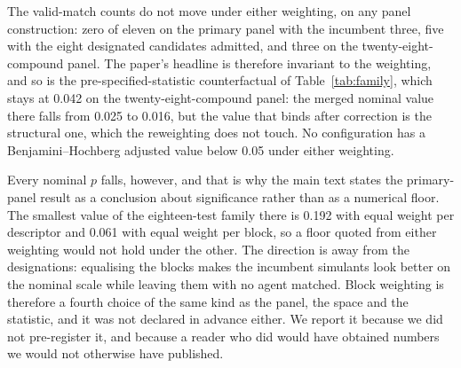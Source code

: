 \documentclass[11pt,a4paper]{article}
\begin{document}
\begin{table}[!htb]
\centering
\caption{Equal weight per descriptor against equal weight per block, in the
merged space. Valid-match counts are identical under the two weightings on
every panel construction. The smallest $p$ is taken over the eighteen-test
family of three spaces by six statistics, and $q$ is the
Benjamini--Hochberg adjusted value of that family.}
\label{tab:blockbalance}
\small

\end{table}

The valid-match counts do not move under either weighting, on any panel
construction: zero of eleven on the primary panel with the incumbent three,
five with the eight designated candidates admitted, and three on the
twenty-eight-compound panel. The paper's headline is therefore invariant to
the weighting, and
so is the pre-specified-statistic counterfactual of Table~\ref{tab:family},
which stays at 0.042 on the twenty-eight-compound panel: the merged nominal value
there falls from 0.025 to 0.016, but the value that binds after correction is the
structural one, which the reweighting does not touch. No configuration has a
Benjamini--Hochberg adjusted value below 0.05 under either weighting.

Every nominal $p$ falls, however, and that is why the main text states the
primary-panel result as a conclusion about significance rather than as a
numerical floor. The smallest value of the eighteen-test family there is 0.192
with equal weight per descriptor and 0.061 with equal weight per block, so a
floor quoted from either weighting would not hold under the other. The direction
is away from the designations: equalising the blocks makes the incumbent
simulants look better on the nominal scale while leaving them with no agent
matched. Block weighting is therefore a fourth choice of the same kind as the
panel, the space and the statistic, and it was not declared in advance either.
We report it because we did not pre-register it, and because a reader who did
would have obtained numbers we would not otherwise have published.
\end{document}
